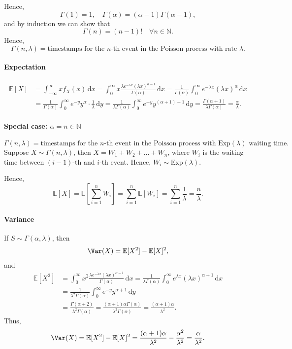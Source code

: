 Hence,
\[
    \Gamma (1) = 1, \quad \Gamma (\alpha ) = (\alpha - 1) \Gamma (\alpha - 1),
\]
and by induction we can show that 
\[
    \Gamma (n) = (n - 1)! \quad \forall n \in \mathbb{N}.
\]
Hence, 
\[
    \Gamma (n, \lambda ) = \text{timestamps for the } n\text{-th event in the Poisson process with rate } \lambda.  
\]

\paragraph{Expectation}
\begin{align*}
    \mathbb{E} [X] &= \int _{-\infty }^{\infty} x f_X(x) \, \mathrm{d} x = \int _0^{\infty} x \frac{\lambda e^{-\lambda x} (\lambda x)^{\alpha - 1}}{\Gamma (\alpha )} \, \mathrm{d} x = \frac{1}{\Gamma (\alpha )} \int _0^{\infty } e^{-\lambda x} (\lambda x)^\alpha \,\mathrm{d} x \\
    &= \frac{1}{\Gamma (\alpha )} \int _0^{\infty} e^{-y} y^\alpha \cdot \frac{1}{\lambda } \, \mathrm{d}y  = \frac{1}{\lambda \Gamma (\alpha )} \int _0^{\infty} e^{-y} y^{(\alpha + 1) - 1} \, \mathrm{d} y = \frac{\Gamma (\alpha + 1)}{\lambda \Gamma (\alpha )} = \frac{\alpha}{\lambda }.   
\end{align*}

\paragraph{Special case: \(\alpha = n \in \mathbb{N}\)} 
\[
    \Gamma (n, \lambda ) = \text{timestamps for the } n\text{-th event in the Poisson process with } \mathrm{Exp}(\lambda ) \text{ waiting time} .  
\]
Suppose \(X \sim \Gamma (n, \lambda )\), then \(X = W_1 + W_2 + \dots + W_n\), where \(W_i\) is the waiting time between \((i-1)\)-th and \(i\)-th event. Hence, \(W_i \sim \mathrm{Exp}(\lambda ) \). 

Hence,
\[
    \mathbb{E} [X] = \mathbb{E} \left[ \sum_{i=1}^n W_i  \right] = \sum_{i=1}^n \mathbb{E} [W_i] = \sum_{i=1}^n \frac{1}{\lambda} = \frac{n}{\lambda}.   
\]

\paragraph{Variance}
If \(S \sim \Gamma (\alpha , \lambda )\), then 
\[
    \Var(X) = \mathbb{E} [X^2] - \mathbb{E} [X]^2, 
\] 
and 
\begin{align*}
    \mathbb{E} [X^2] &= \int _0^{\infty} x^2 \frac{\lambda e^{-\lambda x} (\lambda x)^{\alpha - 1}}{\Gamma (\alpha )} \,\mathrm{d} x = \frac{1}{\lambda \Gamma (\alpha )} \int _0^{\infty} e^{\lambda x} (\lambda x)^{\alpha + 1} \, \mathrm{d} x \\
    &= \frac{1}{\lambda ^2 \Gamma (\alpha )} \int _0^{\infty} e^{-y} y^{\alpha + 1} \, \mathrm{d} y \\
    &= \frac{\Gamma (\alpha + 2)}{\lambda ^2 \Gamma (\alpha)} = \frac{(\alpha + 1) \alpha \Gamma (\alpha)}{\lambda ^2 \Gamma (\alpha )} = \frac{(\alpha + 1) \alpha}{\lambda ^2}. 
\end{align*}
Thus,
\[
    \Var(X) = \mathbb{E} [X^2] - \mathbb{E} [X]^2 = \frac{(\alpha + 1)\alpha }{\lambda ^2} - \frac{\alpha ^2}{\lambda ^2} = \frac{\alpha }{\lambda ^2}.
\]
